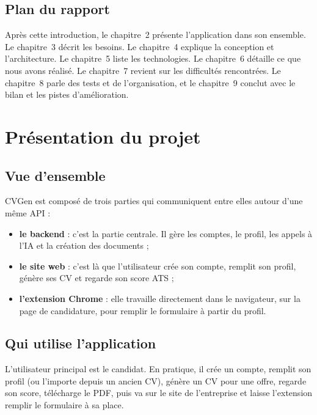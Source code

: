 \documentclass[12pt,a4paper]{report}
\begin{document}
\section{Plan du rapport}
Apr\`es cette introduction, le chapitre~2 pr\'esente l'application dans son
ensemble. Le chapitre~3 d\'ecrit les besoins. Le chapitre~4 explique la conception
et l'architecture. Le chapitre~5 liste les technologies. Le chapitre~6 d\'etaille
ce que nous avons r\'ealis\'e. Le chapitre~7 revient sur les difficult\'es
rencontr\'ees. Le chapitre~8 parle des tests et de l'organisation, et le
chapitre~9 conclut avec le bilan et les pistes d'am\'elioration.

\chapter{Pr\'esentation du projet}

\section{Vue d'ensemble}
CVGen est compos\'e de trois parties qui communiquent entre elles autour d'une
m\^eme API :
\begin{itemize}[leftmargin=1.4em, itemsep=3pt]
  \item \textbf{le backend} : c'est la partie centrale. Il g\`ere les comptes, le
  profil, les appels \`a l'IA et la cr\'eation des documents ;
  \item \textbf{le site web} : c'est l\`a que l'utilisateur cr\'ee son compte,
  remplit son profil, g\'en\`ere ses CV et regarde son score ATS ;
  \item \textbf{l'extension Chrome} : elle travaille directement dans le
  navigateur, sur la page de candidature, pour remplir le formulaire \`a partir du
  profil.
\end{itemize}

\section{Qui utilise l'application}
L'utilisateur principal est le candidat. En pratique, il cr\'ee un compte, remplit
son profil (ou l'importe depuis un ancien CV), g\'en\`ere un CV pour une offre,
regarde son score, t\'el\'echarge le PDF, puis va sur le site de l'entreprise et
laisse l'extension remplir le formulaire \`a sa place.
\end{document}

